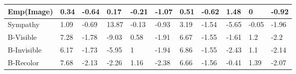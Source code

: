 \begin{table*}[]
\begin{center}
\begin{tabular}{lllllllllll}
\multicolumn{1}{|l|}{Emp(Image)}   & \multicolumn{1}{l|}{0.34} & \multicolumn{1}{l|}{-0.64} & \multicolumn{1}{l|}{0.17}  & \multicolumn{1}{l|}{-0.21} & \multicolumn{1}{l|}{-1.07} & \multicolumn{1}{l|}{0.51} & \multicolumn{1}{l|}{-0.62} & \multicolumn{1}{l|}{1.48}  & \multicolumn{1}{l|}{0}     & \multicolumn{1}{l|}{-0.92} \\ \hline
\multicolumn{1}{|l|}{Sympathy}     & \multicolumn{1}{l|}{1.09} & \multicolumn{1}{l|}{-0.69} & \multicolumn{1}{l|}{13.87} & \multicolumn{1}{l|}{-0.13} & \multicolumn{1}{l|}{-0.93} & \multicolumn{1}{l|}{3.19} & \multicolumn{1}{l|}{-1.54} & \multicolumn{1}{l|}{-5.65} & \multicolumn{1}{l|}{-0.05} & \multicolumn{1}{l|}{-1.96} \\ \hline
\multicolumn{1}{|l|}{B-Visible}    & \multicolumn{1}{l|}{7.28} & \multicolumn{1}{l|}{-1.78} & \multicolumn{1}{l|}{-9.03} & \multicolumn{1}{l|}{0.58}  & \multicolumn{1}{l|}{-1.91} & \multicolumn{1}{l|}{6.67} & \multicolumn{1}{l|}{-1.55} & \multicolumn{1}{l|}{-1.61} & \multicolumn{1}{l|}{1.2}   & \multicolumn{1}{l|}{-2.2}  \\ \hline
\multicolumn{1}{|l|}{B-Invisible}  & \multicolumn{1}{l|}{6.17} & \multicolumn{1}{l|}{-1.73} & \multicolumn{1}{l|}{-5.95} & \multicolumn{1}{l|}{1}     & \multicolumn{1}{l|}{-1.94} & \multicolumn{1}{l|}{6.86} & \multicolumn{1}{l|}{-1.55} & \multicolumn{1}{l|}{-2.43} & \multicolumn{1}{l|}{1.1}   & \multicolumn{1}{l|}{-2.14} \\ \hline
\multicolumn{1}{|l|}{B-Recolor}    & \multicolumn{1}{l|}{7.68} & \multicolumn{1}{l|}{-2.13} & \multicolumn{1}{l|}{-2.26} & \multicolumn{1}{l|}{1.16}  & \multicolumn{1}{l|}{-2.38} & \multicolumn{1}{l|}{6.66} & \multicolumn{1}{l|}{-1.56} & \multicolumn{1}{l|}{-0.41} & \multicolumn{1}{l|}{1.39}  & \multicolumn{1}{l|}{-2.07} \\ \hline
\end{tabular}
\label{table:Assistive_rewards}
\end{center}
\end{table*}
\fi




